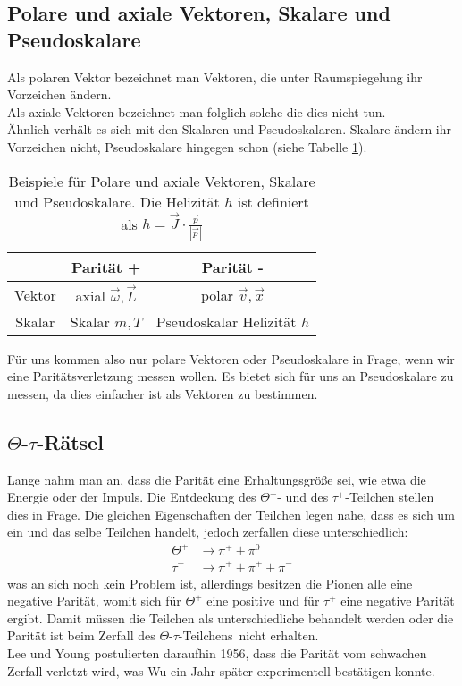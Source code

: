 \documentclass[twoside,colorback,accentcolor=tud4c,11pt]{tudreport}
\begin{document}
\subsection{Polare und axiale Vektoren, Skalare und Pseudoskalare}
Als polaren Vektor bezeichnet man Vektoren, die unter Raumspiegelung ihr Vorzeichen ändern.\\
Als axiale Vektoren bezeichnet man folglich solche die dies nicht tun.\\
Ähnlich verhält es sich mit den Skalaren und Pseudoskalaren. Skalare ändern ihr Vorzeichen nicht, Pseudoskalare hingegen schon (siehe Tabelle \ref{tab:polar}).
\begin{table}[H]
\centering
\begin{tabular}{|c|c|c|}
\hline 
 & Parität + & Parität - \\ 
\hline 
Vektor & \shortstack{axial\\$\vec{\omega},\vec{L}$} & \shortstack{polar \\$\vec{v},\vec{x}$} \\ 
\hline 
Skalar & \shortstack{Skalar \\$m,T$} & \shortstack{Pseudoskalar\\Helizität $h$} \\ 
\hline 
\end{tabular} 
\caption{Beispiele für Polare und axiale Vektoren, Skalare und Pseudoskalare. Die Helizität $h$ ist definiert als $h=\vec{J}\cdot\frac{\vec{p}}{|\vec{p}|}$}\label{tab:polar}
\end{table}
Für uns kommen also nur polare Vektoren oder Pseudoskalare in Frage, wenn wir eine Paritätsverletzung messen wollen. Es bietet sich für uns an Pseudoskalare zu messen, da dies einfacher ist als Vektoren zu bestimmen.
\subsection{$\Theta$-$\tau$-Rätsel}
Lange nahm man an, dass die Parität eine Erhaltungsgröße sei, wie etwa die Energie oder der Impuls. Die Entdeckung des $ \Theta^+ $- und des $ \tau^+ $-Teilchen stellen dies in Frage. Die gleichen Eigenschaften der Teilchen legen nahe, dass es sich um ein und das selbe Teilchen handelt, jedoch zerfallen diese unterschiedlich:
\begin{align}
\Theta^+&\rightarrow\pi^++\pi^0\\
\tau^+&\rightarrow\pi^++\pi^++\pi^-
\end{align}
was an sich noch kein Problem ist, allerdings besitzen die Pionen alle eine negative Parität, womit sich für $\Theta^+$ eine positive und für $\tau^+$ eine negative Parität ergibt. Damit müssen die Teilchen als unterschiedliche behandelt werden oder die Parität ist beim Zerfall des \glqq $\Theta$-$\tau$-Teilchens\grqq\, nicht erhalten.\\
Lee und Young postulierten daraufhin 1956, dass die Parität vom schwachen Zerfall verletzt wird, was Wu ein Jahr später experimentell bestätigen konnte.
\end{document}
